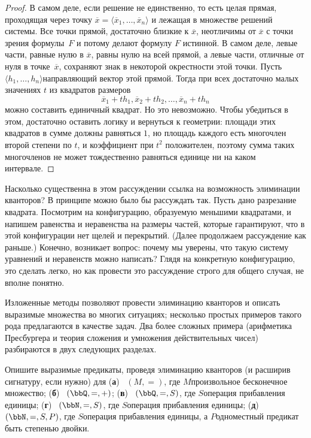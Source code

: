 \begin{proof}
В самом деле, если решение не единственно, то есть целая прямая,
проходящая через точку $\overline{x}=
\langle\overline{x}_1,\dots,\overline{x}_n\rangle$ и лежащая в
множестве решений системы. Все точки прямой, достаточно близкие
к $\overline{x}$, неотличимы от $\overline{x}$ с точки зрения
формулы~$F$ и потому делают формулу $F$ истинной. В самом деле,
левые части, равные нулю в $\overline{x}$, равны нулю на всей
прямой, а левые части, отличные от нуля в точке~$\overline{x}$,
сохраняют знак в некоторой окрестности этой точки. Пусть
$\langle h_1,\dots,h_n\rangle$\т направляющий вектор этой
прямой. Тогда при всех достаточно малых значениях $t$ из
квадратов размеров
        $$
\overline{x}_1+th_1,
\overline{x}_2+th_2,\dots,
\overline{x}_n+th_n
        $$
можно составить единичный
квадрат. Но это невозможно. Чтобы убедиться
в этом, достаточно оставить логику и вернуться к геометрии:
площади этих квадратов в сумме должны равняться $1$, но
площадь каждого есть многочлен второй степени по $t$,
и коэффициент при $t^2$ положителен, поэтому сумма таких
многочленов не может тождественно равняться единице ни на каком
интервале.
\end{proof}

Насколько существенна в этом рассуждении ссылка на возможность
элиминации кванторов? В принципе можно было бы рассуждать так.
Пусть дано разрезание квадрата. Посмотрим на конфигурацию,
образуемую меньшими квадратами, и напишем равенства и
неравенства на размеры частей, которые гарантируют, что в этой
конфигурации нет щелей и перекрытий. (Далее продолжаем
рассуждение как раньше.) Конечно, возникает вопрос: почему мы
уверены, что такую систему уравнений и неравенств можно
написать? Глядя на конкретную конфигурацию, это сделать легко,
но как провести это рассуждение строго для общего случая, не
вполне понятно.

\medskip

Изложенные методы позволяют провести элиминацию кванторов
и описать выразимые множества во многих ситуациях; несколько
простых примеров такого рода предлагаются в качестве задач.
Два более сложных примера (арифметика Пресбургера и
теория сложения и умножения действительных чисел) разбираются
в двух следующих разделах.

\begin{problem}
Опишите выразимые предикаты, проведя элиминацию
кванторов (и расширив сигнатуру, если нужно) для
       (\textbf{а})~%
$(M, {=})$, где $M$\т произвольное
бесконечное множество;
       (\textbf{б})~%
$(\bbQ, {=},{+})$;
       (\textbf{в})~%
$(\bbQ, {=}, S)$, где $S$\т операция прибавления единицы;
       (\textbf{г})~%
$(\bbN, {=}, S)$, где $S$\т операция прибавления единицы;
       (\textbf{д})~%
$(\bbN, {=}, S, P)$, где $S$\т операция прибавления единицы,
а $P$\т одноместный предикат  быть степенью двойки.
\end{problem}
